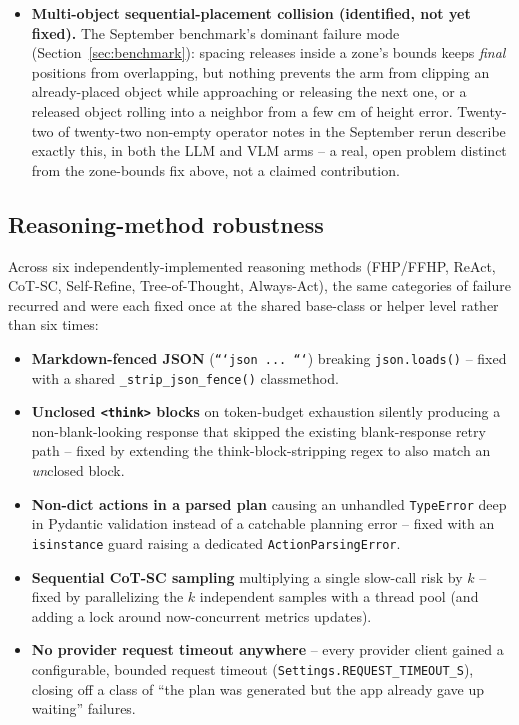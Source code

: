 \begin{itemize}[nosep]
    optional \texttt{targets} registry (the ROBOAI-19 \texttt{bounds}
    schema) and, when a release cluster's anchor matches a known zone,
    lays out occupants on a grid centered on the anchor and clamped to that
    zone's bounds; falls back to the old unbounded behavior when no zone
    matches (the case for point-grounded VLM releases, which have no
    footprint to match against).
  \item \textbf{Multi-object sequential-placement collision (identified,
    not yet fixed).} The September benchmark's dominant failure mode
    (Section~\ref{sec:benchmark}): spacing releases inside a zone's bounds
    keeps \emph{final} positions from overlapping, but nothing prevents the
    arm from clipping an already-placed object while approaching or
    releasing the next one, or a released object rolling into a neighbor
    from a few cm of height error. Twenty-two of twenty-two non-empty
    operator notes in the September rerun describe exactly this, in both
    the LLM and VLM arms -- a real, open problem distinct from the
    zone-bounds fix above, not a claimed contribution.
\end{itemize}

\subsection{Reasoning-method robustness}

Across six independently-implemented reasoning methods (FHP/FFHP, ReAct,
CoT-SC, Self-Refine, Tree-of-Thought, Always-Act), the same categories of
failure recurred and were each fixed once at the shared base-class or helper
level rather than six times:

\begin{itemize}[nosep]
  \item \textbf{Markdown-fenced JSON} (\texttt{```json ... ```}) breaking
    \texttt{json.loads()} -- fixed with a shared
    \texttt{\_strip\_json\_fence()} classmethod.
  \item \textbf{Unclosed \texttt{<think>} blocks} on token-budget exhaustion
    silently producing a non-blank-looking response that skipped the
    existing blank-response retry path -- fixed by extending the
    think-block-stripping regex to also match an \emph{un}closed block.
  \item \textbf{Non-dict actions in a parsed plan} causing an unhandled
    \texttt{TypeError} deep in Pydantic validation instead of a catchable
    planning error -- fixed with an \texttt{isinstance} guard raising a
    dedicated \texttt{ActionParsingError}.
  \item \textbf{Sequential CoT-SC sampling} multiplying a single slow-call
    risk by $k$ -- fixed by parallelizing the $k$ independent samples with a
    thread pool (and adding a lock around now-concurrent metrics updates).
  \item \textbf{No provider request timeout anywhere} -- every provider
    client gained a configurable, bounded request timeout
    (\texttt{Settings.REQUEST\_TIMEOUT\_S}), closing off a class of ``the plan
    was generated but the app already gave up waiting'' failures.
\end{itemize}

